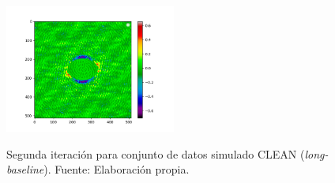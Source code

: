 \begin{figure}[!ht]
{   \label{fig:clean_residual_color_2iter}
    \includegraphics[width=0.5\textwidth]{images/sim_p1_long_color_residual.png}}
 \caption[Segunda iteración para conjunto de datos simulado CLEAN (\textit{long-baseline})]{Segunda iteración para conjunto de datos simulado CLEAN (\textit{long-baseline}). Fuente: Elaboración propia.}
 \label{fig:phasecal_2iter}
\end{figure}

